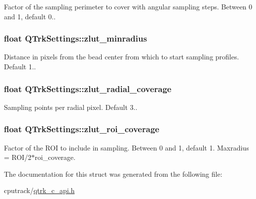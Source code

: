 Factor of the sampling perimeter to cover with angular sampling steps. Between 0 and 1, default 0.. 

\subsubsection[{\texorpdfstring{zlut\+\_\+minradius}{zlut_minradius}}]{\setlength{\rightskip}{0pt plus 5cm}float Q\+Trk\+Settings\+::zlut\+\_\+minradius}\hypertarget{struct_q_trk_settings_a1a14537a9e784c65eed512e72ee86c02}{}\label{struct_q_trk_settings_a1a14537a9e784c65eed512e72ee86c02}


Distance in pixels from the bead center from which to start sampling profiles. Default 1.. 

\subsubsection[{\texorpdfstring{zlut\+\_\+radial\+\_\+coverage}{zlut_radial_coverage}}]{\setlength{\rightskip}{0pt plus 5cm}float Q\+Trk\+Settings\+::zlut\+\_\+radial\+\_\+coverage}\hypertarget{struct_q_trk_settings_ae57544152a8a129bae6cb934feead1c7}{}\label{struct_q_trk_settings_ae57544152a8a129bae6cb934feead1c7}


Sampling points per radial pixel. Default 3.. 

\subsubsection[{\texorpdfstring{zlut\+\_\+roi\+\_\+coverage}{zlut_roi_coverage}}]{\setlength{\rightskip}{0pt plus 5cm}float Q\+Trk\+Settings\+::zlut\+\_\+roi\+\_\+coverage}\hypertarget{struct_q_trk_settings_a33db8dee144b4a042f5440fa1f210e6a}{}\label{struct_q_trk_settings_a33db8dee144b4a042f5440fa1f210e6a}


Factor of the R\+OI to include in sampling. Between 0 and 1, default 1. Maxradius = R\+O\+I/2$\ast$roi\+\_\+coverage. 



The documentation for this struct was generated from the following file\+:\begin{DoxyCompactItemize}
\item 
cputrack/\hyperlink{qtrk__c__api_8h}{qtrk\+\_\+c\+\_\+api.\+h}\end{DoxyCompactItemize}
